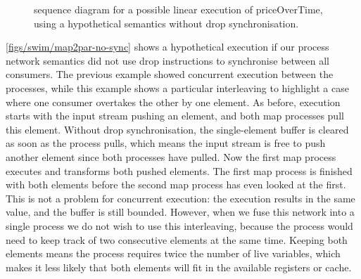 \begin{figure}
\center
\begin{sequencediagram}









\end{sequencediagram}
\caption{sequence diagram for a possible linear execution of priceOverTime, using a hypothetical semantics without drop synchronisation. }
\label{figs/swim/drop/priceOverTime-nosync}
\end{figure}



\autoref{figs/swim/map2par-no-sync} shows a hypothetical execution if our process network semantics did not use drop instructions to synchronise between all consumers.
The previous example showed concurrent execution between the processes, while this example shows a particular interleaving to highlight a case where one consumer overtakes the other by one element.
As before, execution starts with the input stream pushing an element, and both map processes pull this element.
Without drop synchronisation, the single-element buffer is cleared as soon as the process pulls, which means the input stream is free to push another element since both processes have pulled.
Now the first map process executes and transforms both pushed elements.
The first map process is finished with both elements before the second map process has even looked at the first.
This is not a problem for concurrent execution: the execution results in the same value, and the buffer is still bounded.
However, when we fuse this network into a single process we do not wish to use this interleaving, because the process would need to keep track of two consecutive elements at the same time.
Keeping both elements means the process requires twice the number of live variables, which makes it less likely that both elements will fit in the available registers or cache.

